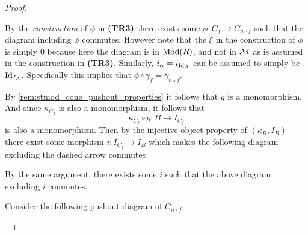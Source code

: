 \begin{proof}
\begin{enumerate}[label={(\bfseries TR\arabic*)}]
{            By the \emph{construction} of \( \phi \) in {\bf (TR3)} there exists some \( \phi: C_f \to C_{n \circ f} \) such that the diagram including \( \phi \) commutes. However note that the \( \xi \) in the construction of \( \phi \) is simply \( 0 \) because here the diagram is in \( \operatorname{Mod}(R) \), and not in \( {\mathcal{M}} \) as is assumed in the construction in {\bf (TR3)}. Similarly, \( i_\alpha = i_{\operatorname{Id}_A} \) can be assumed to simply be \( \operatorname{Id}_{I_A} \). Specifically this implies that \( \phi \circ \gamma_f = \gamma_{n \circ f} \).

            By \autoref{rem:stmod_cone_pushout_properties} it follows that \( g \) is a monomorphism. And since \( \kappa_{C_f} \) is also a monomorphism, it follows that
            \[
                \kappa_{C_f} \circ g: B \to I_{C_f}
            \]
            is also a monomorphism. Then by the injective object property of \( (\kappa_B, I_B) \) there exist some morphism \( i: I_{C_f} \to I_B \) which makes the following diagram excluding the dashed arrow commutes
            \begin{center}
            \end{center}
            By the same argument, there exists some \( \tilde{i} \) such that the above diagram excluding \( i \) commutes.
            
            Consider the following pushout diagram of \( C_{n \circ f} \)
            \begin{center}
\end{center}}
\end{enumerate}
\end{proof}
